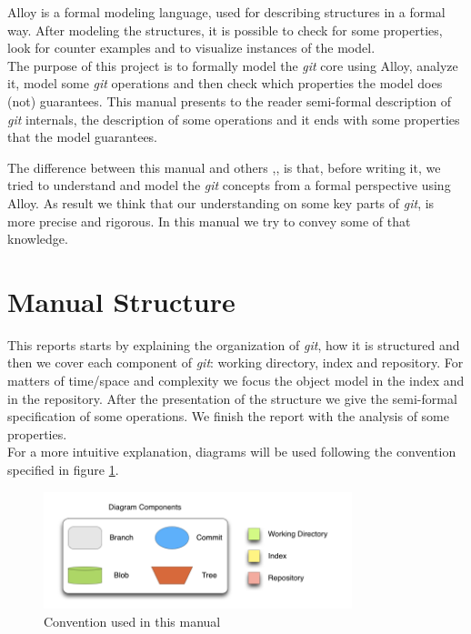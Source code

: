 Alloy \cite{Jackson:2006:SAL:1146359} is a formal modeling language, used for describing structures in 
a formal way. After modeling the structures, it is possible to
check for some properties, look for counter examples and to visualize 
instances of the model. \\

The purpose of this project is to
formally model the \emph{git} core using Alloy, analyze it, model some \emph{git}
operations and then check which properties the model does (not)
guarantees. This manual presents to the reader semi-formal description of
\emph{git} internals, the description of some operations and it ends with
some properties that the model guarantees.

The difference between this manual and others \cite{gitComm},\cite{progit}, is
that, before writing it, we tried to understand and model 
the \emph{git} concepts from a formal perspective using Alloy. As result 
we think that our understanding on some key parts of \emph{git}, is more precise
and rigorous. In this manual we try to convey some of that knowledge.

\section{Manual Structure}
This reports starts by explaining the organization of \emph{git}, how
it is structured and then we cover each component of \emph{git}:
working directory, index and repository. For matters
of time/space and complexity we focus the object model in the index and in the
repository. After the presentation of the structure we give the semi-formal
specification of some operations. We finish the report with the
analysis of some properties. \\

For a more intuitive explanation, diagrams will be used following
the convention specified in figure \ref{fig:notation}. 

\begin{figure}[tp]
   \centering
   \includegraphics[width=0.8\textwidth]{images/Legenda.png}
   \caption{Convention used in this manual}
   \label{fig:notation}
\end{figure}

